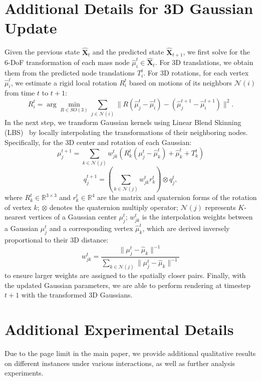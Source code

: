 \documentclass[10pt,twocolumn,letterpaper]{article}
\begin{document}
\section{Additional Details for 3D Gaussian Update}
Given the previous state $\hat{\mathbf{X}}_{t}$ and the predicted state $\hat{\mathbf{X}}_{t+1}$, we first solve for the 6-DoF transformation of each mass node $\hat{\mu}^t_i \in \hat{\mathbf{X}}_{t}$. For 3D translations, we obtain them from the predicted node translations $T^t_i$. For 3D rotations, for each vertex $\hat{\mu}^t_i$, we estimate a rigid local rotation $R^t_i$ based on motions of its neighbors $\mathcal{N}(i)$ from time $t$ to $t+1$:
\begin{equation}
R_i^t = \arg \min_{R \in SO(3)} \sum_{j \in \mathcal{N}(i)} \|R(\hat{\mu}_j^t - \hat{\mu}_i^t) - (\hat{\mu}_j^{t+1} - \hat{\mu}_i^{t+1})\|^2.
\end{equation}
In the next step, we transform Gaussian kernels using Linear Blend Skinning (LBS)~\cite{sumner2007embedded, zhang2024dynamic, huang2024sc} by locally interpolating the transformations of their neighboring nodes. Specifically, for the 3D center and rotation of each Gaussian:
\begin{equation}
\mu_j^{t+1} = \sum_{k \in \mathcal{N}(j)} w_{jk}^t (R_k^t (\mu_j^t - \hat{\mu}_k^t) + \hat{\mu}_k^t + T_k^t)
\end{equation}
\begin{equation}
q_j^{t+1} = (\sum_{k \in \mathcal{N}(j)} w_{jk}^t r_k^t) \otimes q_j^t,
\end{equation}
where $R_k^t \in \mathbb{R}^{3\times 3}$ and $r_k^t \in \mathbb{R}^{4}$ are the matrix and quaternion forms of the rotation of vertex $k$; $\otimes$ denotes the quaternion multiply operator; $\mathcal{N}(j)$ represents $K$-nearest vertices of a Gaussian center $\mu_j^t$; $w_{jk}^t$ is the interpolation weights between a Gaussian $\mu_j^t$ and a corresponding vertex $\hat{\mu}_k^t$, which are derived inversely proportional to their 3D distance:
\begin{equation}
w_{jk}^t = \frac{\|\mu_j^t - \hat{\mu}_k\|^{-1}}{\sum_{k \in \mathcal{N}(j)} \|\mu_j^t - \hat{\mu}_k\|^{-1}}
\end{equation}
to ensure larger weights are assigned to the spatially closer pairs. Finally, with the updated Gaussian parameters, we are able to perform rendering at timestep $t+1$ with the transformed 3D Gaussians.

\section{Additional Experimental Details}
Due to the page limit in the main paper, we provide additional qualitative results on different instances under various interactions, as well as further analysis experiments.
\end{document}

